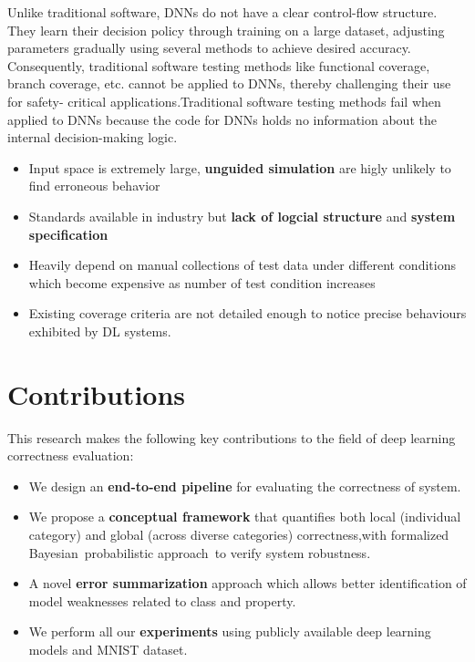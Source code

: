 \documentclass[10pt, conference, a4paper, final]{IEEEtran}
\begin{document}
Unlike traditional software, DNNs do not have a clear control-flow structure. They learn their decision policy through training on a large dataset, adjusting parameters gradually using several methods to achieve desired accuracy. Consequently, traditional software testing methods like functional coverage, branch coverage, etc. cannot be applied to DNNs, thereby challenging their use for safety- critical applications.Traditional software testing methods fail when applied to DNNs because the code for DNNs holds no information about the internal decision-making logic.
\begin{itemize}
    \item Input space is extremely large, \textbf{unguided simulation} are higly unlikely to find erroneous behavior
    \item Standards available in industry but \textbf{lack of logcial structure} and \textbf{system specification}  
     \item Heavily depend on manual collections of test data under different conditions which become expensive as number of test condition increases
     \item  Existing coverage criteria are not detailed enough to notice precise behaviours exhibited by DL systems.
\end{itemize}


\section{Contributions}
This research makes the following key contributions to the field of deep learning correctness evaluation:
\begin{itemize}
   
    \item We design an \textbf{end-to-end pipeline} for evaluating the correctness of system.
    
    \item We propose a \textbf{conceptual framework} that quantifies both local (individual category) and global (across diverse categories) correctness,with formalized Bayesian probabilistic approach to verify system robustness.
    \item A novel \textbf{error summarization}  approach which allows better identification of model weaknesses related to class and property.

    \item We perform all our \textbf{experiments} using publicly available deep learning models and MNIST dataset.
\end{itemize}
\end{document}
